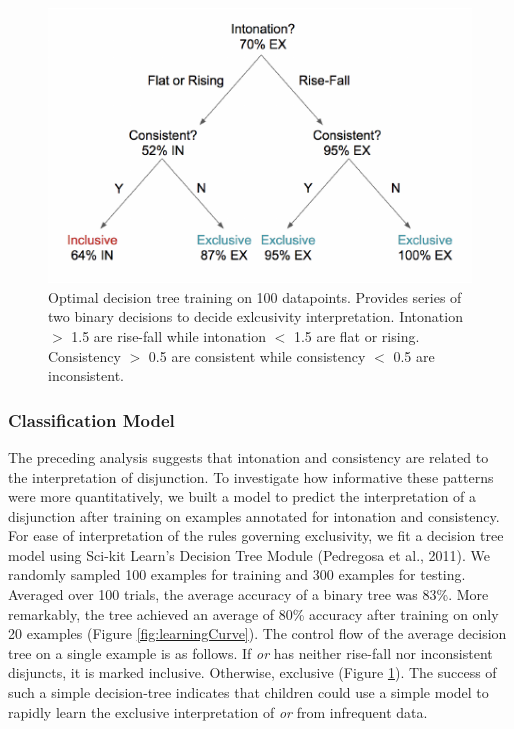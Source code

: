 \documentclass[10pt, letterpaper]{article}
\newenvironment{CodeChunk}{}{}
\begin{document}
\begin{CodeChunk}
\begin{figure}[tb]

{\centering \includegraphics{figs/treeDiagram-1} 

}

\caption[Optimal decision tree training on 100 datapoints]{Optimal decision tree training on 100 datapoints. Provides series of two binary decisions to decide exlcusivity interpretation. Intonation $>$ 1.5 are rise-fall while intonation $<$ 1.5 are flat or rising. Consistency $>$ 0.5 are consistent while consistency $<$ 0.5 are  inconsistent.}\label{fig:treeDiagram}
\end{figure}
\end{CodeChunk}

\subsubsection{Classification Model}\label{classification-model}

The preceding analysis suggests that intonation and consistency are
related to the interpretation of disjunction. To investigate how
informative these patterns were more quantitatively, we built a model to
predict the interpretation of a disjunction after training on examples
annotated for intonation and consistency. For ease of interpretation of
the rules governing exclusivity, we fit a decision tree model using
Sci-kit Learn's Decision Tree Module (Pedregosa et al., 2011). We
randomly sampled 100 examples for training and 300 examples for testing.
Averaged over 100 trials, the average accuracy of a binary tree was
83\%. More remarkably, the tree achieved an average of 80\% accuracy
after training on only 20 examples (Figure \ref{fig:learningCurve}). The
control flow of the average decision tree on a single example is as
follows. If \emph{or} has neither rise-fall nor inconsistent disjuncts,
it is marked inclusive. Otherwise, exclusive (Figure
\ref{fig:treeDiagram}). The success of such a simple decision-tree
indicates that children could use a simple model to rapidly learn the
exclusive interpretation of \emph{or} from infrequent data.
\end{document}
